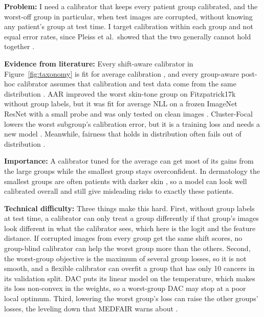 \documentclass[sigconf,nonacm]{acmart}
\begin{document}
\textbf{Problem:} I need a calibrator that keeps every patient group calibrated, and the worst-off group in particular, when test images are corrupted, without knowing any patient's group at test time. I target calibration within each group and not equal error rates, since Pleiss et al.\ showed that the two generally cannot hold together \cite{pleiss2017fairness}.

\textbf{Evidence from literature:} Every shift-aware calibrator in Figure~\ref{fig:taxonomy} is fit for average calibration \cite{tomani2021posthoc,yu2022multidomain,tomani2023dac,kim2024energy}, and every group-aware post-hoc calibrator assumes that calibration and test data come from the same distribution \cite{hebertjohnson2018multicalibration,salvador2022faircal,shen2025calin}. AAR improved the worst skin-tone group on Fitzpatrick17k without group labels, but it was fit for average NLL on a frozen ImageNet ResNet with a small probe and was only tested on clean images \cite{yuksekgonul2023atypicality}. Cluster-Focal lowers the worst subgroup's calibration error, but it is a training loss and needs a new model \cite{shui2023clusterfocal}. Meanwhile, fairness that holds in distribution often fails out of distribution \cite{schrouff2022diagnosing,yang2024limits}.

\textbf{Importance:} A calibrator tuned for the average can get most of its gains from the large groups while the smallest group stays overconfident. In dermatology the smallest groups are often patients with darker skin \cite{groh2021fitzpatrick}, so a model can look well calibrated overall and still give misleading risks to exactly these patients.

\textbf{Technical difficulty:} Three things make this hard. First, without group labels at test time, a calibrator can only treat a group differently if that group's images look different in what the calibrator sees, which here is the logit and the feature distance. If corrupted images from every group get the same shift scores, no group-blind calibrator can help the worst group more than the others. Second, the worst-group objective is the maximum of several group losses, so it is not smooth, and a flexible calibrator can overfit a group that has only 10 cancers in its validation split. DAC puts its linear model on the temperature, which makes its loss non-convex in the weights, so a worst-group DAC may stop at a poor local optimum. Third, lowering the worst group's loss can raise the other groups' losses, the leveling down that MEDFAIR warns about \cite{zong2023medfair}.
\end{document}
